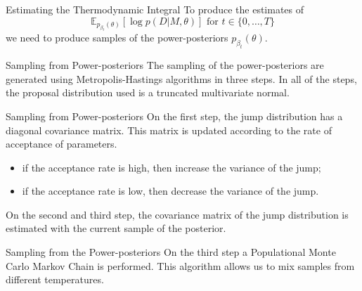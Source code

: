 \documentclass{beamer}
\newcommand{\expectation}{\mathbb{E}}
\begin{document}
\begin{frame}{Estimating the Thermodynamic Integral}
To produce the estimates of 
\begin{equation*}
    \expectation_{p_{\beta_{t}} (\theta)}[\log p(D | M, \theta)]
    \text{ for }
    t \in \{0, \ldots, T\}
\end{equation*}    
we need to produce samples of the 
power-posteriors $p_{\beta_{t}} (\theta)$.
\end{frame}

%
%
%
%
\begin{frame}{Sampling from Power-posteriors}
The sampling of the power-posteriors are generated using 
Metropolis-Hastings algorithms in three steps. \pause In all of the 
steps, the proposal distribution used is a truncated multivariate 
normal.
\end{frame}


\begin{frame}{Sampling from Power-posteriors}
On the first step, the jump distribution has a diagonal covariance 
matrix. \pause This matrix is updated according to the rate of 
acceptance of parameters.

\pause
\begin{itemize}
\item{if the acceptance rate is high, then increase the variance of the
    jump;}

\pause
\item{if the acceptance rate is low, then decrease the variance of the 
    jump.}
\end{itemize}

\pause
On the second and third step, the covariance matrix of the jump 
distribution is estimated with the current sample of the posterior.
\end{frame}

\begin{frame}{Sampling from the Power-posteriors}
On the third step a Populational Monte Carlo Markov Chain is performed.
This algorithm allows us to mix samples from different temperatures.
\end{frame}
\end{document}
